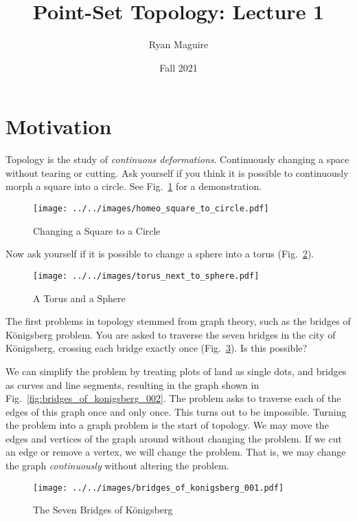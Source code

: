 \documentclass{article}
\title{Point-Set Topology: Lecture 1}
\author{Ryan Maguire}
\date{Fall 2021}
\theoremstyle{plain}
\theoremstyle{normal}
\begin{document}
    \maketitle
    \section{Motivation}
        Topology is the study of \textit{continuous deformations}. Continuously
        changing a space without tearing or cutting. Ask yourself if you think
        it is possible to continuously morph a square into a circle.
        See Fig.~\ref{fig:homeo_square_to_circle} for a demonstration.
        \begin{figure}[H]
            \centering
            \texttt{[image: ../../images/homeo\_square\_to\_circle.pdf]}
            \caption{Changing a Square to a Circle}
            \label{fig:homeo_square_to_circle}
        \end{figure}
        Now ask yourself if it is possible to change a sphere into a torus
        (Fig.~\ref{fig:torus_next_to_sphere}).
        \begin{figure}[H]
            \centering
            \texttt{[image: ../../images/torus\_next\_to\_sphere.pdf]}
            \caption{A Torus and a Sphere}
            \label{fig:torus_next_to_sphere}
        \end{figure}
        The first problems in topology
        stemmed from graph theory, such as the bridges of K\"{o}nigsberg
        problem. You are asked to traverse the seven bridges in the city of
        K\"{o}nigsberg, crossing each bridge exactly once
        (Fig.~\ref{fig:bridges_of_konigsberg_001}). Is this possible?
        \par\hfill\par
        We can simplify the problem by treating plots of land as single dots,
        and bridges as curves and line segments, resulting in the graph
        shown in Fig.~\ref{fig:bridges_of_konigsberg_002}. The problem asks to
        traverse each of the edges of this graph once and only once. This turns
        out to be impossible. Turning the problem into a graph problem is the
        start of topology. We may move the edges and vertices of the graph
        around without changing the problem. If we cut an edge or remove a
        vertex, we will change the problem. That is, we may change the graph
        \textit{continuously} without altering the problem.
        \begin{figure}
            \centering
            \texttt{[image: ../../images/bridges\_of\_konigsberg\_001.pdf]}
            \caption{The Seven Bridges of K\"{o}nigsberg}
            \label{fig:bridges_of_konigsberg_001}
        \end{figure}
\end{document}
